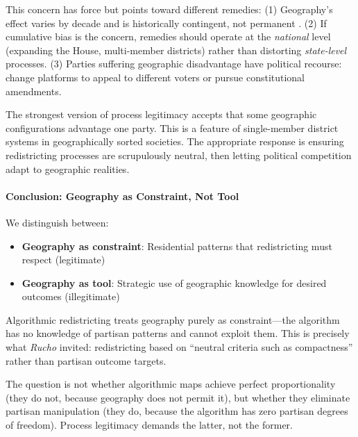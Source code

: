 This concern has force but points toward different remedies: (1) Geography's effect varies by decade and is historically contingent, not permanent \citep{chen2017impact}. (2) If cumulative bias is the concern, remedies should operate at the \textit{national} level (expanding the House, multi-member districts) rather than distorting \textit{state-level} processes. (3) Parties suffering geographic disadvantage have political recourse: change platforms to appeal to different voters or pursue constitutional amendments.

The strongest version of process legitimacy accepts that some geographic configurations advantage one party. This is a feature of single-member district systems in geographically sorted societies. The appropriate response is ensuring redistricting processes are scrupulously neutral, then letting political competition adapt to geographic realities.

\paragraph{Conclusion: Geography as Constraint, Not Tool}

We distinguish between:
\begin{itemize}
\item \textbf{Geography as constraint}: Residential patterns that redistricting must respect (legitimate)
\item \textbf{Geography as tool}: Strategic use of geographic knowledge for desired outcomes (illegitimate)
\end{itemize}

Algorithmic redistricting treats geography purely as constraint---the algorithm has no knowledge of partisan patterns and cannot exploit them. This is precisely what \textit{Rucho} invited: redistricting based on ``neutral criteria such as compactness'' rather than partisan outcome targets.

The question is not whether algorithmic maps achieve perfect proportionality (they do not, because geography does not permit it), but whether they eliminate partisan manipulation (they do, because the algorithm has zero partisan degrees of freedom). Process legitimacy demands the latter, not the former.
